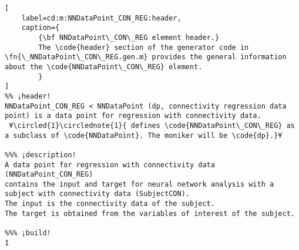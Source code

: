 \documentclass{tufte-handout}
\begin{document}
\begin{lstlisting}[
	label=cd:m:NNDataPoint_CON_REG:header,
	caption={
		{\bf NNDataPoint\_CON\_REG element header.}
		The \code{header} section of the generator code in \fn{\_NNDataPoint\_CON\_REG.gen.m} provides the general information about the \code{NNDataPoint\_CON\_REG} element.
		}
]
%% ¡header!
NNDataPoint_CON_REG < NNDataPoint (dp, connectivity regression data point) is a data point for regression with connectivity data.
 ¥\circled{1}\circlednote{1}{ defines \code{NNDataPoint\_CON\_REG} as a subclass of \code{NNDataPoint}. The moniker will be \code{dp}.}¥

%%% ¡description!
A data point for regression with connectivity data (NNDataPoint_CON_REG) 
contains the input and target for neural network analysis with a subject with connectivity data (SubjectCON).
The input is the connectivity data of the subject.
The target is obtained from the variables of interest of the subject.

%%% ¡build!
1
\end{lstlisting}
\end{document}
